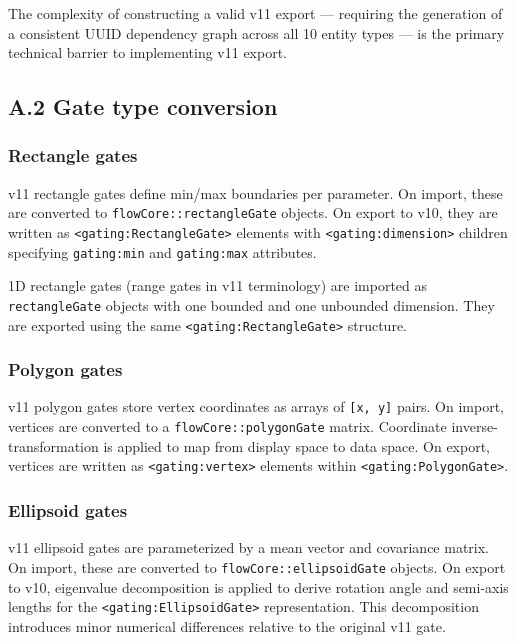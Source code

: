 \documentclass[
]{article}
\begin{document}
The complexity of constructing a valid v11 export --- requiring the
generation of a consistent UUID dependency graph across all 10 entity
types --- is the primary technical barrier to implementing v11 export.

\subsection{A.2 Gate type conversion}\label{a.2-gate-type-conversion}

\subsubsection{Rectangle gates}\label{rectangle-gates}

v11 rectangle gates define min/max boundaries per parameter. On import,
these are converted to \texttt{flowCore::rectangleGate} objects. On
export to v10, they are written as
\texttt{\textless{}gating:RectangleGate\textgreater{}} elements with
\texttt{\textless{}gating:dimension\textgreater{}} children specifying
\texttt{gating:min} and \texttt{gating:max} attributes.

1D rectangle gates (range gates in v11 terminology) are imported as
\texttt{rectangleGate} objects with one bounded and one unbounded
dimension. They are exported using the same
\texttt{\textless{}gating:RectangleGate\textgreater{}} structure.

\subsubsection{Polygon gates}\label{polygon-gates}

v11 polygon gates store vertex coordinates as arrays of
\texttt{{[}x,\ y{]}} pairs. On import, vertices are converted to a
\texttt{flowCore::polygonGate} matrix. Coordinate inverse-transformation
is applied to map from display space to data space. On export, vertices
are written as \texttt{\textless{}gating:vertex\textgreater{}} elements
within \texttt{\textless{}gating:PolygonGate\textgreater{}}.

\subsubsection{Ellipsoid gates}\label{ellipsoid-gates}

v11 ellipsoid gates are parameterized by a mean vector and covariance
matrix. On import, these are converted to
\texttt{flowCore::ellipsoidGate} objects. On export to v10, eigenvalue
decomposition is applied to derive rotation angle and semi-axis lengths
for the \texttt{\textless{}gating:EllipsoidGate\textgreater{}}
representation. This decomposition introduces minor numerical
differences relative to the original v11 gate.
\end{document}
